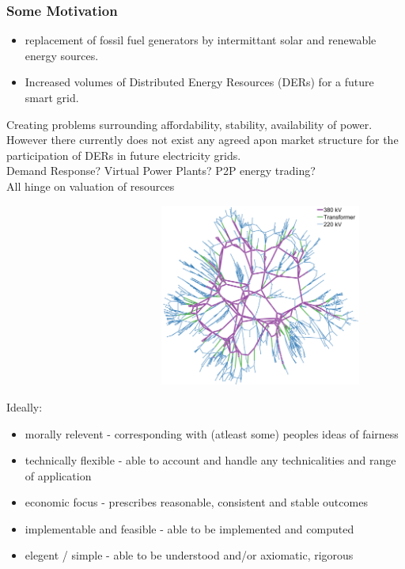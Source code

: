 \begin{frame}
\frametitle{Some Motivation}
\begin{itemize}
\item	replacement of fossil fuel generators by intermittant solar and renewable energy sources.
\item	Increased volumes of Distributed Energy Resources (DERs) for a future smart grid.
\end{itemize}
Creating problems surrounding affordability, stability, availability of power.
However there currently does not exist any agreed apon market structure for the participation of DERs in future electricity grids.\\

Demand Response? Virtual Power Plants? P2P energy trading?\\
All hinge on valuation of resources

$\qquad\qquad\qquad\qquad\qquad\qquad\qquad$\includegraphics[height=6cm]{figs/network.png}
\end{frame}

\begin{frame}
Ideally:
\begin{itemize}
\item	morally relevent - corresponding with (atleast some) peoples ideas of fairness
\item	technically flexible - able to account and handle any technicalities and range of application
\item	economic focus - prescribes reasonable, consistent and stable outcomes
\item	implementable and feasible - able to be implemented and computed
\item	elegent / simple - able to be understood and/or axiomatic, rigorous
\end{itemize}
\end{frame}







